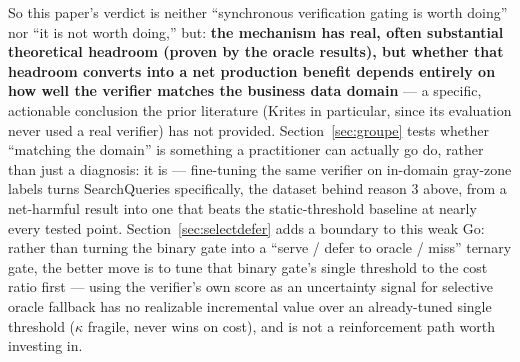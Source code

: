 \documentclass[11pt]{article}
\begin{document}
So this paper's verdict is neither ``synchronous verification gating is worth doing'' nor ``it is not worth doing,'' but: \textbf{the mechanism has real, often substantial theoretical headroom (proven by the oracle results), but whether that headroom converts into a net production benefit depends entirely on how well the verifier matches the business data domain} --- a specific, actionable conclusion the prior literature (Krites in particular, since its evaluation never used a real verifier) has not provided. Section~\ref{sec:groupe} tests whether ``matching the domain'' is something a practitioner can actually go do, rather than just a diagnosis: it is --- fine-tuning the same verifier on in-domain gray-zone labels turns SearchQueries specifically, the dataset behind reason 3 above, from a net-harmful result into one that beats the static-threshold baseline at nearly every tested point. Section~\ref{sec:selectdefer} adds a boundary to this weak Go: rather than turning the binary gate into a ``serve / defer to oracle / miss'' ternary gate, the better move is to tune that binary gate's single threshold to the cost ratio first --- using the verifier's own score as an uncertainty signal for selective oracle fallback has no realizable incremental value over an already-tuned single threshold ($\kappa$ fragile, never wins on cost), and is not a reinforcement path worth investing in.
\end{document}
